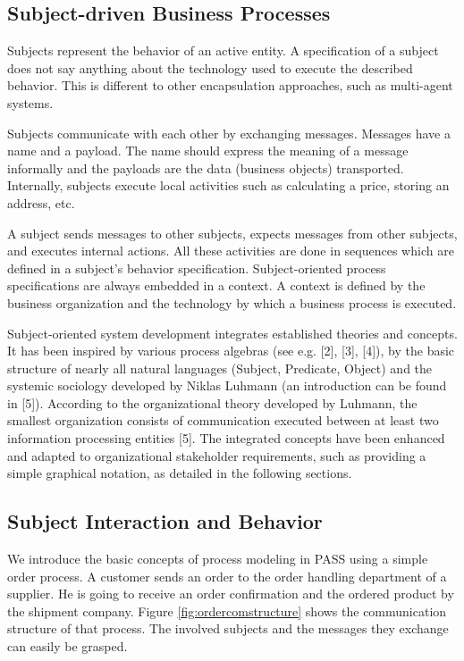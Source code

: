 \subsection{Subject-driven Business Processes}

Subjects represent the behavior of an active entity. A specification of a subject does not say anything about the technology used to execute the described behavior. This is different to other encapsulation approaches, such as multi-agent systems.

Subjects communicate with each other by exchanging messages. Messages have a name and a payload. The name should express the meaning of a message informally and the payloads are the data (business objects) transported. Internally, subjects execute local activities such as calculating a price, storing an address, etc.

A subject sends messages to other subjects, expects messages from other subjects, and executes internal actions. All these activities are done in sequences which are defined in a subject's behavior specification. Subject-oriented process specifications are always embedded in a context. A context is defined by the business organization and the technology by which a business process is executed.

Subject-oriented system development integrates established theories and concepts. It has been inspired by various process algebras (see e.g. [2], [3], [4]), by the basic structure of nearly all natural languages (Subject, Predicate, Object) and the systemic sociology developed by Niklas Luhmann (an introduction can be found in [5]). According to the organizational theory developed by Luhmann, the smallest organization consists of communication executed between at least two information processing entities [5]. The integrated concepts have been enhanced and adapted to organizational stakeholder requirements, such as providing a simple graphical notation, as detailed in the following sections.

\subsection{Subject Interaction and Behavior}

We introduce the basic concepts of process modeling in PASS using a simple order process. A customer sends an order to the order handling department of a supplier. He is going to receive an order confirmation and the ordered product by the shipment company. Figure \ref{fig:ordercomstructure} shows the communication structure of that process. The involved subjects and the messages they exchange can easily be grasped. 

